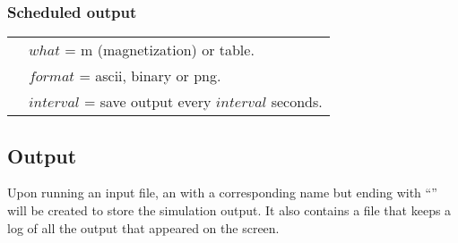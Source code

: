\subsubsection*{Scheduled output}
\begin{tabular}{ll}
[what format interval]{autosave}  & $what$ = m (magnetization) or table.\\
& $format$ = ascii, binary or png.\\
& $interval$ = save output every $interval$ seconds.
\end{tabular}


\subsection{Output}


Upon running an input file, an  with a corresponding name but ending with ``'' will be created to store the simulation output. It also contains a file  that keeps a log of all the output that appeared on the screen.  


